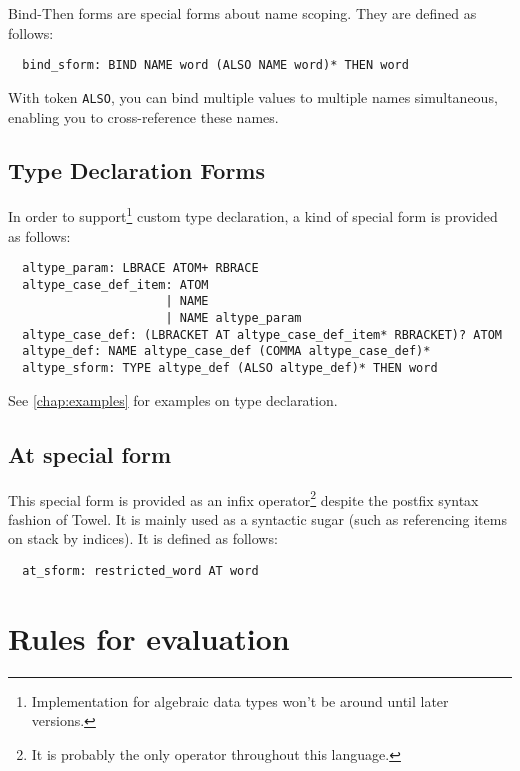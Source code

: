 \documentclass{book}
\begin{document}
Bind-Then forms are special forms about name scoping. They are defined as follows:
\begin{verbatim}
  bind_sform: BIND NAME word (ALSO NAME word)* THEN word
\end{verbatim}

With token \texttt{ALSO}, you can bind multiple values to multiple names simultaneous, enabling you to cross-reference these names.

\subsection{Type Declaration Forms}\label{ssec:tdsf}

In order to support\footnote{Implementation for algebraic data types won't be around until later versions.} custom type declaration, a kind of special form is provided as follows:
\begin{verbatim}
  altype_param: LBRACE ATOM+ RBRACE
  altype_case_def_item: ATOM
                      | NAME
                      | NAME altype_param
  altype_case_def: (LBRACKET AT altype_case_def_item* RBRACKET)? ATOM
  altype_def: NAME altype_case_def (COMMA altype_case_def)*
  altype_sform: TYPE altype_def (ALSO altype_def)* THEN word
\end{verbatim}

See \autoref{chap:examples} for examples on type declaration.

\subsection{At special form}

This special form is provided as an infix operator\footnote{It is probably the only operator throughout this language.} despite the postfix syntax fashion of Towel. It is mainly used as a syntactic sugar (such as referencing items on stack by indices). It is defined as follows:
\begin{verbatim}
  at_sform: restricted_word AT word
\end{verbatim}

\section{Rules for evaluation}
\end{document}
